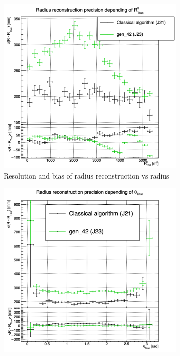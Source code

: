 \documentclass[../main.tex]{subfiles}
\begin{document}
{{\begin{figure}[ht]
  \begin{subfigure}[t]{0.32\linewidth}
    \centering
    \includegraphics[width=\linewidth]{images/jcnn/vic_cnn/multi_vic_42_MSBvRTC.png}
    \caption{Resolution and bias of radius reconstruction vs radius}
    \label{fig:jcnn:vic_cnn:multi_vic_42_MSBvRTC}
  \end{subfigure}
  \begin{subfigure}[t]{0.32\linewidth}
    \centering
    \includegraphics[width=\linewidth]{images/jcnn/vic_cnn/multi_vic_42_MSBvTTC.png}

\end{subfigure}
\end{figure}}}
\end{document}
